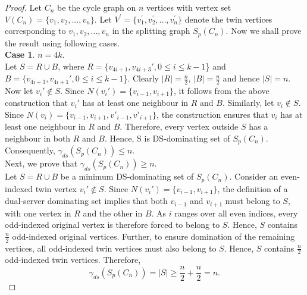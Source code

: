 \documentclass{article}
\begin{document}
\begin{proof}
Let $C_n$ be the cycle graph on $n$ vertices with vertex set $V(C_n)= \{v_1, v_2, ..., v_n\}$. Let $V^\prime= \{v_1^\prime, v_2^\prime, ..., v_n^\prime\}$ denote the twin vertices corresponding to $v_1, v_2, ..., v_n$ in the splitting graph $S_p(C_n)$. Now we shall prove the result using following cases.\\

\textbf{Case 1}. $n= 4k$.\\ Let $S= R \cup B$, where $R= \{v_{4i+1}, v_{4i+3}', 0 \le i \le k-1$\} and $B= \{v_{4i+3}, v_{4i+1}', 0 \le i \le k-1$\}. Clearly $|R|= \frac{n}{2}$, $|B|= \frac{n}{2}$ and hence $|S|= n$.\\ Now let $v_i' \notin S$. Since $N(v_i')= \{v_{i-1}, v_{i+1}\}$, it follows from the above construction that $v_i'$ has at least one neighbour in $R$ and $B$. Similarly, let $v_i \notin S$. Since $N(v_i)= \{v_{i-1}, v_{i+1}, v'_{i-1}, v'_{i+1}\}$, the construction ensures that $v_i$ has at least one neighbour in $R$ and $B$. Therefore, every vertex outside $S$ has a neighbour in both $R$ and $B$. Hence, S is DS-dominating set of $S_p(C_n)$. Consequently, $\gamma_{ds}(S_p(C_n)) \leq n$.\\

Next, we prove that $\gamma_{ds}(S_p(C_n)) \geq n$.\\ Let $S= R \cup B$  be a minimum DS-dominating set of $S_p(C_n)$. Consider an even-indexed twin vertex $v_i' \notin S$. Since $N(v_i')= \{v_{i-1}, v_{i+1}\}$, the definition of a dual-server dominating set implies that both $v_{i-1}$ and  $v_{i+1}$ must belong to $S$, with one vertex in $R$ and the other in $B$. As $i$ ranges over all even indices, every odd-indexed original vertex is therefore forced to belong to $S$. Hence, $S$ contains $ \frac{n}{2} $ odd-indexed original vertices. Further, to ensure domination of the remaining vertices, all odd-indexed twin vertices must also belong to $S$. Hence, $S$ contains $\frac{n}{2} $ odd-indexed twin vertices. Therefore,
\[\gamma_{ds}(S_p(C_n))=|S| \geq  \frac{n}{2} + \frac{n}{2} =n. \] 


\end{proof}
\end{document}
